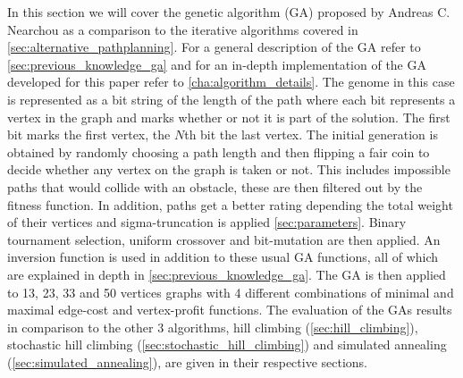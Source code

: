 In this section we will cover the genetic algorithm (GA) proposed by Andreas C. Nearchou \cite{8} as a comparison to the iterative algorithms covered in \ref{sec:alternative_pathplanning}. For a general description of the GA refer to \ref{sec:previous_knowledge_ga} and for an in-depth implementation of the GA developed for this paper refer to \ref{cha:algorithm_details}.
The genome in this case is represented as a bit string of the length of the path where each bit represents a vertex in the graph and marks whether or not it is part of the solution. The first bit marks the first vertex, the $N$th bit the last vertex. The initial generation is obtained by randomly choosing a path length and then flipping a fair coin to decide whether any vertex on the graph is taken or not. This includes impossible paths that would collide with an obstacle, these are then filtered out by the fitness function. In addition, paths get a better rating depending the total weight of their vertices and sigma-truncation is applied \ref{sec:parameters}. Binary tournament selection, uniform crossover and bit-mutation are then applied. An inversion function is used in addition to these usual GA functions, all of which are explained in depth in \ref{sec:previous_knowledge_ga}.
The GA is then applied to 13, 23, 33 and 50 vertices graphs with 4 different combinations of minimal and maximal edge-cost and vertex-profit functions. The evaluation of the GAs results in comparison to the other 3 algorithms, hill climbing (\ref{sec:hill_climbing}), stochastic hill climbing (\ref{sec:stochastic_hill_climbing}) and simulated annealing (\ref{sec:simulated_annealing}), are given in their respective sections.